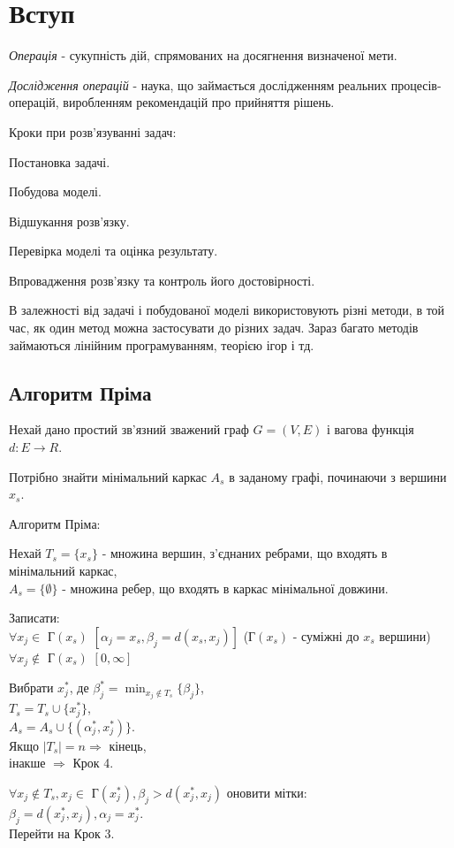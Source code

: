\documentclass[12pt,a4paper]{book}
\newenvironment{slim_enumerate}{
\begin{enumerate}
  \setlength{\itemsep}{1pt}
  \setlength{\parskip}{0pt}
  \setlength{\parsep}{0pt}}
{\end{enumerate}}
\begin{document}
\tableofcontents

\chapter{Вступ}

\emph{Операція} - сукупність дій, спрямованих на досягнення визначеної мети.

\emph{Дослідження операцій} - наука, що займається дослідженням реальних процесів-операцій, виробленням рекомендацій про прийняття рішень.

Кроки при розв'язуванні задач:
\begin{slim_enumerate}
  \item Постановка задачі.
  \item Побудова моделі.
  \item Відшукання розв'язку.
  \item Перевірка моделі та оцінка результату.
  \item Впровадження розв'язку та контроль його достовірності.
\end{slim_enumerate}

В залежності від задачі і побудованої моделі використовують різні методи, в той час, як один метод можна застосувати до різних задач. Зараз багато методів займаються лінійним програмуванням, теорією ігор і тд.

\section{Алгоритм Пріма}

Нехай дано простий зв’язний зважений граф $G=(V,E)$ і вагова функція $d:E\rightarrow R$.

Потрібно знайти мінімальний каркас $A_s$ в заданому графі, починаючи з вершини $x_s$.

Алгоритм Пріма:
\begin{slim_enumerate}
  \item Нехай $T_s = \{x_s\}$ - множина вершин, з’єднаних ребрами, що входять в мінімальний каркас,\\
$A_s = \{\emptyset\}$ - множина ребер, що входять в каркас мінімальної довжини.
  \item Записати:\\
$\forall x_j\in$ Г$(x_s)$ $[\alpha_j=x_s, \beta_j=d(x_s,x_j)]$ (Г$(x_s)$ - суміжні до $x_s$ вершини)\\
$\forall x_j\notin$ Г$(x_s)$ $[0,\infty]$
  \item Вибрати $x_j^*$, де $\beta_j^*=\displaystyle\min_{x_j\notin T_s}\{\beta_j\}$,\\
$T_s=T_s\cup\{x_j^*\}$,\\
$A_s=A_s\cup\{(\alpha_j^*,x_j^*)\}$.\\
Якщо $|T_s|=n\Rightarrow$ кінець,\\
інакше ${\Rightarrow}$ Крок 4.
  \item $\forall x_j\notin T_s, x_j\in$ Г$(x_j^*), \beta_j>d(x_j^*,x_j)$ оновити мітки:\\
$\beta_j=d(x_j^*,x_j), \alpha_j=x_j^*$.\\
Перейти на Крок 3.
\end{slim_enumerate}
\end{document}
